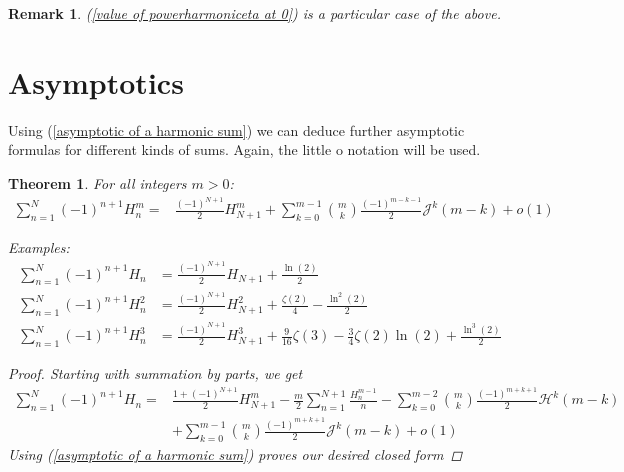 \documentclass{article}
\newcommand{\pHz}[2]{\mathcal{H}^{#1}(#2)}
\newcommand{\powerharmonicetafunction}[2]{{\mathcal{J}}^{#1}(#2)}
\newtheorem{theorem}{Theorem}
\newtheorem{remark}{Remark}%
\begin{document}
\begin{remark} (\ref{value of powerharmoniceta at 0}) is a particular case of the above.
\end{remark}
\section{Asymptotics}

Using (\ref{asymptotic of a harmonic sum}) we can deduce further asymptotic formulas for different kinds of sums. Again, the little o notation will be used. 

\begin{theorem}\label{Asymptotic of sums of alternating Harmonic powers} For all integers $m>0$:
\begin{equation}\begin{split}
    \sum_{n=1}^N(-1)^{n+1}H_n^m=&\frac{(-1)^{N+1}}{2}H_{N+1}^m+\sum_{k=0}^{m-1}\binom{m}{k}\frac{(-1)^{m-k-1}}{2}\powerharmonicetafunction{k}{m-k}+o(1)
    \end{split}
\end{equation}

\textit{Examples:}
\begin{align*}
    \sum_{n=1}^N(-1)^{n+1}H_n & =\frac{(-1)^{N+1}}{2}H_{N+1}+\frac{\ln(2)}{2}\\ 
    \sum_{n=1}^N(-1)^{n+1}H_n^2 & =\frac{(-1)^{N+1}}{2}H_{N+1}^2+\frac{\zeta(2)}{4}-\frac{\ln^2(2)}{2}\\  \sum_{n=1}^N(-1)^{n+1}H_n^3 & =\frac{(-1)^{N+1}}{2}H_{N+1}^3+\frac{9}{16}\zeta(3)-\frac{3}{4}\zeta(2)\ln(2)+\frac{\ln^3(2)}{2}
\end{align*}

\begin{proof}
    Starting with summation by parts, we get
    \[\begin{split}\sum_{n=1}^N(-1)^{n+1}H_n = &\frac{1+(-1)^{N+1}}{2}H_{N+1}^m-\frac{m}{2}\sum_{n=1}^{N+1}\frac{H_n^{m-1}}{n}-\sum_{k=0}^{m-2}\binom{m}{k}\frac{(-1)^{m+k+1}}{2}\pHz{k}{m-k} \\ &+ \sum_{k=0}^{m-1}\binom{m}{k}\frac{(-1)^{m+k+1}}{2}\powerharmonicetafunction{k}{m-k}+o(1)\end{split}\]
    Using (\ref{asymptotic of a harmonic sum}) proves our desired closed form
\end{proof}
\end{theorem}
\end{document}

